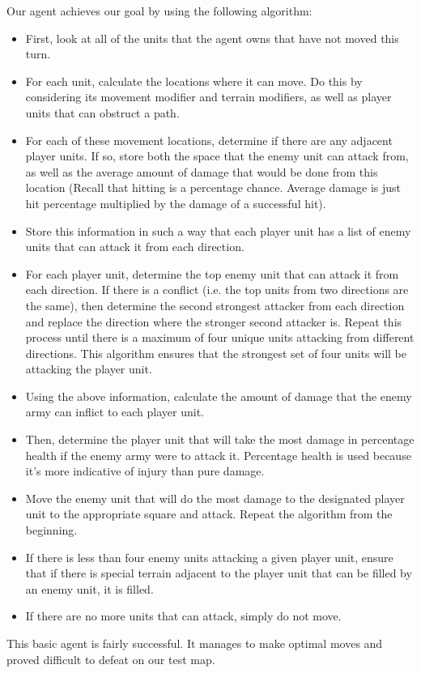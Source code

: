 \documentclass[12pt]{article} %
\begin{document}
	Our agent achieves our goal by using the following algorithm:
\begin{itemize}
\item	First, look at all of the units that the agent owns that have not moved this turn.
\item	For each unit, calculate the locations where it can move. Do this by considering its movement modifier and terrain modifiers, as well as player units that can obstruct a path.
\item	For each of these movement locations, determine if there are any adjacent player units. If so, store both the space that the enemy unit can attack from, as well as the average amount of damage that would be done from this location (Recall that hitting is a percentage chance. Average damage is just hit percentage multiplied by the damage of a successful hit).
\item	Store this information in such a way that each player unit has a list of enemy units that can attack it from each direction.
\item	For each player unit, determine the top enemy unit that can attack it from each direction. If there is a conflict (i.e. the top units from two directions are the same), then determine the second strongest attacker from each direction and replace the direction where the stronger second attacker is. Repeat this process until there is a maximum of four unique units attacking from different directions. This algorithm ensures that the strongest set of four units will be attacking the player unit.
\item	Using the above information, calculate the amount of damage that the enemy army can inflict to each player unit. 
\item	Then, determine the player unit that will take the most damage in percentage health if the enemy army were to attack it. Percentage health is used because it’s more indicative of injury than pure damage.
\item	Move the enemy unit that will do the most damage to the designated player unit to the appropriate square and attack. Repeat the algorithm from the beginning.
\item	If there is less than four enemy units attacking a given player unit, ensure that if there is special terrain adjacent to the player unit that can be filled by an enemy unit, it is filled.
\item	If there are no more units that can attack, simply do not move.
\end{itemize}
This basic agent is fairly successful. It manages to make optimal moves and proved difficult to defeat on our test map.
\end{document}
